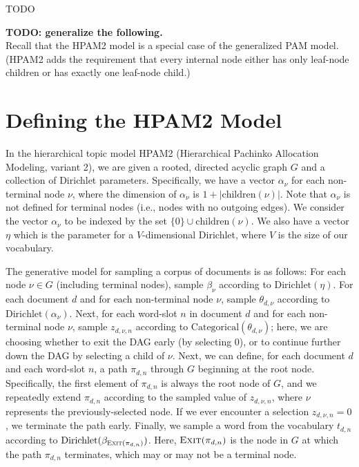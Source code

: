 \documentclass{article}
\theoremstyle{definition}
\newcommand{\Exit}{\textsc{Exit}}
\begin{document}
TODO


\clearpage

{\bf TODO: generalize the following.} \\
Recall that the HPAM2 model is a special case of the generalized PAM model.
(HPAM2 adds the requirement that every internal node either has only leaf-node children or has exactly one leaf-node child.)

\section{Defining the HPAM2 Model}

In the hierarchical topic model HPAM2 (Hierarchical Pachinko Allocation Modeling, variant 2), we are given a rooted, directed acyclic graph $G$ and a collection of Dirichlet parameters.
Specifically, we have a vector $\alpha_\nu$ for each non-terminal node $\nu$, where the dimension of $\alpha_\nu$ is $1 + |\text{children}(\nu)|$.
Note that $\alpha_\nu$ is not defined for terminal nodes (i.e., nodes with no outgoing edges).
We consider the vector $\alpha_\nu$ to be indexed by the set $\{0\} \cup \text{children}(\nu)$.
We also have a vector $\eta$ which is the parameter for a $V$-dimensional Dirichlet, where $V$ is the size of our vocabulary.

The generative model for sampling a corpus of documents is as follows:
For each node $\nu \in G$ (including terminal nodes), sample $\beta_\nu$ according to $\text{Dirichlet}(\eta)$.
For each document $d$ and for each non-terminal node $\nu$, sample $\theta_{d,\nu}$ according to $\text{Dirichlet}(\alpha_\nu)$.
Next, for each word-slot $n$ in document $d$ and for each non-terminal node $\nu$, sample $z_{d,\nu,n}$ according to $\text{Categorical}(\theta_{d,\nu})$; here, we are choosing whether to exit the DAG early (by selecting $0$), or to continue further down the DAG by selecting a child of $\nu$.
Next, we can define, for each document $d$ and each word-slot $n$, a path $\pi_{d,n}$ through $G$ beginning at the root node.
Specifically, the first element of $\pi_{d,n}$ is always the root node of $G$, and we repeatedly extend $\pi_{d,n}$ according to the sampled value of $z_{d,\nu,n}$, where $\nu$ represents the previously-selected node.
If we ever encounter a selection $z_{d,\nu,n} = 0$, we terminate the path early.
Finally, we sample a word from the vocabulary $t_{d,n}$ according to $\text{Dirichlet}(\beta_{\Exit(\pi_{d,n})})$.
Here, $\Exit(\pi_{d,n})$ is the node in $G$ at which the path $\pi_{d,n}$ terminates, which may or may not be a terminal node.
\end{document}
